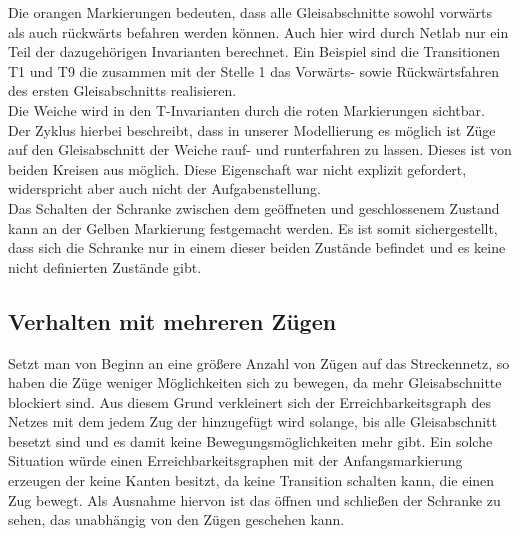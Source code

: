 \documentclass[10pt]{scrartcl}
\begin{document}
Die orangen Markierungen bedeuten, dass alle Gleisabschnitte sowohl vorwärts als auch rückwärts befahren werden können.
Auch hier wird durch Netlab nur ein Teil der dazugehörigen Invarianten berechnet.
Ein Beispiel sind die Transitionen T1 und T9 die zusammen mit der Stelle 1 das Vorwärts- sowie Rückwärtsfahren des ersten Gleisabschnitts realisieren.\\

Die Weiche wird in den T-Invarianten durch die roten Markierungen sichtbar.
Der Zyklus hierbei beschreibt, dass in unserer Modellierung es möglich ist Züge auf den Gleisabschnitt der Weiche rauf- und runterfahren zu lassen.
Dieses ist von beiden Kreisen aus möglich.
Diese Eigenschaft war nicht explizit gefordert, widerspricht aber auch nicht der Aufgabenstellung.\\

Das Schalten der Schranke zwischen dem geöffneten und geschlossenem Zustand kann an der Gelben Markierung festgemacht werden.
Es ist somit sichergestellt, dass sich die Schranke nur in einem dieser beiden Zustände befindet und es keine nicht definierten Zustände gibt. 

\subsection{Verhalten mit mehreren Zügen}
Setzt man von Beginn an eine größere Anzahl von Zügen auf das Streckennetz, so haben die Züge weniger Möglichkeiten sich zu bewegen, da mehr Gleisabschnitte blockiert sind. Aus diesem Grund verkleinert sich der Erreichbarkeitsgraph des Netzes mit dem jedem Zug der hinzugefügt wird solange, bis alle Gleisabschnitt besetzt sind und es damit keine Bewegungsmöglichkeiten mehr gibt. Ein solche Situation würde einen Erreichbarkeitsgraphen mit der Anfangsmarkierung erzeugen der keine Kanten besitzt, da keine Transition schalten kann, die einen Zug bewegt. Als Ausnahme hiervon ist das öffnen und schließen der Schranke zu sehen, das unabhängig von den Zügen geschehen kann.
 
\end{document}
